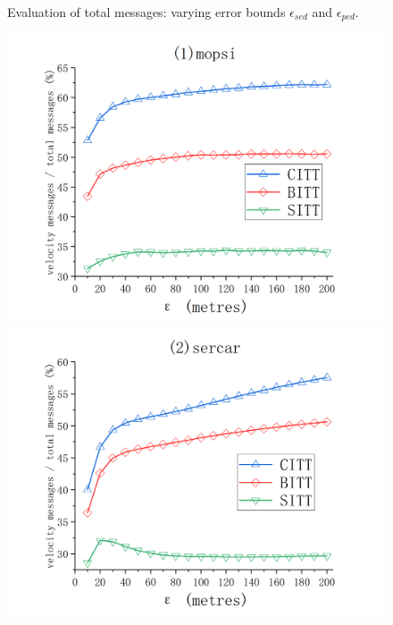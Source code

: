 {\begin{figure}[tb!]
	\caption{\small Evaluation of total messages: varying error bounds $\epsilon_{sed}$ and $\epsilon_{ped}$.}
	\label{fig:total-message}
\end{figure}

\begin{figure}[tb!]
	\centering
	\includegraphics[scale = 0.210]{figures/Fig-mopsi-speed-messages.png}\hspace{1ex}
	\includegraphics[scale = 0.210]{figures/Fig-sercar-speed-messages.png}\hspace{1ex}

\end{figure}}
